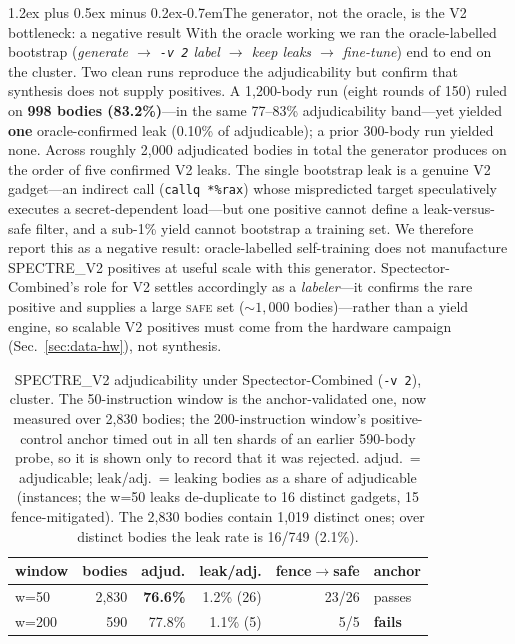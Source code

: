 \documentclass[conference]{IEEEtran}
\makeatletter
\renewcommand\paragraph{\@startsection{paragraph}{4}{\z@}%
  {1.2ex plus 0.5ex minus 0.2ex}{-0.7em}{\normalfont\normalsize\bfseries}}
\makeatother
\begin{document}
\paragraph{The generator, not the oracle, is the V2 bottleneck: a negative
result} With the oracle working we ran the oracle-labelled bootstrap
(\emph{generate $\to$ \texttt{-v 2} label $\to$ keep leaks $\to$ fine-tune})
end to end on the cluster. Two clean runs reproduce the adjudicability
but confirm that synthesis does not supply positives. A 1{,}200-body run
(eight rounds of 150) ruled on \textbf{998 bodies (83.2\%)}---in the same
77--83\% adjudicability band---yet yielded \textbf{one} oracle-confirmed leak (0.10\% of
adjudicable); a prior 300-body run yielded none. Across roughly 2{,}000
adjudicated bodies in total the generator produces on the order of five
confirmed V2 leaks. The single bootstrap leak is a genuine V2 gadget---an
indirect call (\texttt{callq~*\%rax}) whose mispredicted target speculatively
executes a secret-dependent load---but one positive cannot define a
leak-versus-safe filter, and a sub-1\% yield cannot bootstrap a training set.
We therefore report this as a negative result: oracle-labelled self-training
does not manufacture SPECTRE\_V2 positives at useful scale with this generator.
Spectector-Combined's role for V2 settles accordingly as a \emph{labeler}---it
confirms the rare positive and supplies a large \textsc{safe} set
(${\sim}1{,}000$ bodies)---rather than a yield engine, so scalable V2 positives must come from
the hardware campaign (Sec.~\ref{sec:data-hw}), not synthesis.

\begin{table}[t]
\centering
\caption{SPECTRE\_V2 adjudicability under Spectector-Combined (\texttt{-v 2}),
  cluster. The 50-instruction window is the anchor-validated one, now measured
  over 2{,}830 bodies; the 200-instruction window's positive-control anchor
  timed out in all ten shards of an earlier 590-body probe, so it is shown only
  to record that it was rejected. adjud.\ = adjudicable; leak/adj.\ = leaking
  bodies as a share of adjudicable (instances; the w=50 leaks de-duplicate to
  16 distinct gadgets, 15 fence-mitigated). The 2{,}830 bodies contain 1{,}019
  distinct ones; over distinct bodies the leak rate is 16/749 (2.1\%).}
\label{tab:v2adj}
\footnotesize
\setlength{\tabcolsep}{4pt}
\begin{tabular}{@{}lrrrrl@{}}
\toprule
window & bodies & adjud. & leak/adj. & fence$\to$safe & anchor \\
\midrule
w=50  & 2{,}830 & \textbf{76.6\%} & 1.2\% (26) & 23/26 & passes \\
w=200 & 590     & 77.8\%          & 1.1\% (5)  & 5/5   & \textbf{fails} \\
\bottomrule
\end{tabular}
\end{table}
\end{document}
